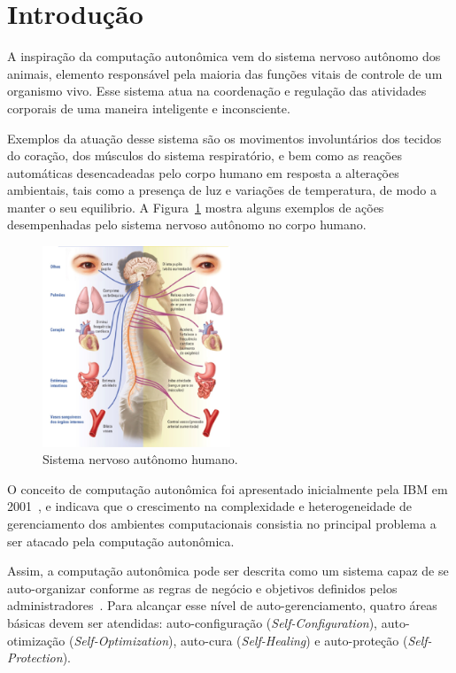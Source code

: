 \documentclass[11pt,twoside]{article}
\begin{document}
\section{Introdução}

A inspiração da computação autonômica vem do sistema nervoso autônomo dos animais, elemento responsável pela maioria das funções vitais de controle de um organismo vivo. Esse sistema atua na coordenação e regulação das atividades corporais de uma maneira inteligente e inconsciente. 

Exemplos da atuação desse sistema são os movimentos involuntários dos tecidos do coração, dos músculos do sistema respiratório, e bem como as reações automáticas desencadeadas pelo corpo humano em resposta a alterações ambientais, tais como a presença de luz e variações de temperatura, de modo a manter o seu equilibrio. A Figura~\ref{Sec:Intro:Fig1} mostra alguns exemplos de ações desempenhadas pelo sistema nervoso autônomo no corpo humano.

\begin{figure}
    \centering
    \includegraphics[width=0.5\textwidth]{Picture1.png}
    \caption{Sistema nervoso autônomo humano.}
    \label{Sec:Intro:Fig1}
\end{figure}

O conceito de computação autonômica foi apresentado inicialmente pela IBM em 2001~\cite{KEPHART}, e indicava que o crescimento na complexidade e heterogeneidade de gerenciamento dos ambientes computacionais consistia no principal problema a ser atacado pela computação autonômica. 

Assim, a computação autonômica pode ser descrita como um sistema capaz de se auto-organizar conforme as regras de negócio e objetivos definidos pelos administradores~\cite{ROMILDO}. Para alcançar esse nível de auto-gerenciamento, quatro áreas básicas devem ser atendidas: auto-configuração (\textit{Self-Configuration}), auto-otimização (\textit{Self-Optimization}), auto-cura (\textit{Self-Healing}) e auto-proteção (\textit{Self-Protection}).
\end{document}
